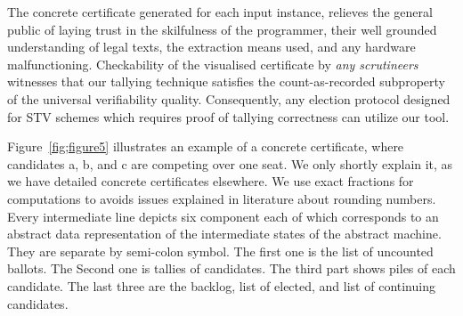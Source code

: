 \documentclass{llncs}
\begin{document}
The concrete certificate generated for each input instance, relieves the general public of laying trust in the skilfulness of the programmer, their  well grounded understanding of legal texts, the extraction means used, and any hardware malfunctioning. 
Checkability of the visualised certificate by \emph{any scrutineers} witnesses that our tallying technique satisfies the count-as-recorded subproperty of the universal verifiability quality. Consequently, any election protocol designed for STV schemes which requires proof of tallying correctness can utilize our tool.

 Figure~\ref{fig;figure5} illustrates an example of a concrete certificate, where candidates a, b, and c are competing over one seat. We only shortly explain it, as we have detailed concrete certificates elsewhere\cite{}.  We use exact fractions for computations to avoids issues explained in literature\cite{} about rounding numbers. Every intermediate line depicts six component each of which corresponds to an abstract data representation of the intermediate states of the abstract  machine. They are separate by semi-colon symbol.  The first one is the list of uncounted ballots. The Second one is tallies of candidates. The third part shows piles of each candidate. The last three are the backlog, list of elected, and list of continuing candidates. 
 
\end{document}

